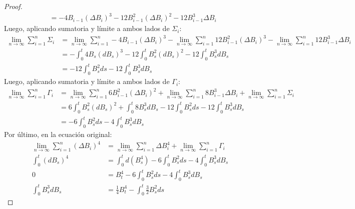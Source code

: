 \documentclass[11pt]{article}
\theoremstyle{definition}
\theoremstyle{remark}
\theoremstyle{remark}
\begin{document}
\begin{proof}
\begin{align*}
    &= -4B_{i-1}(\Delta B_i)^3 - 12B_{i-1}^2(\Delta B_i)^2 - 12B_{i-1}^3\Delta B_i
  \end{align*}
  Luego, aplicando sumatoria y límite a ambos lados de $\Sigma_i$:
  \begin{align*}
    \lim_{n \rightarrow \infty}\sum_{i =1}^{n}\Sigma_i
    &= \lim_{n \rightarrow \infty}\sum_{i =1}^{n} -4B_{i-1}(\Delta B_i)^3 -
      \lim_{n \rightarrow \infty}\sum_{i =1}^{n} 12B_{i-1}^2(\Delta B_i)^3 -
      \lim_{n \rightarrow \infty}\sum_{i =1}^{n} 12B_{i-1}^3\Delta B_i \\
    &= -\int_0^t 4B_s (dB_s)^3 - 12 \int_0^t B_s^2 (dB_s)^2 - 12 \int_0^t B_s^3 dB_s \\
    &= -12\int_0^t B_s^2 ds -12 \int_0^t B_s^3 dB_s
  \end{align*}
    Luego, aplicando sumatoria y límite a ambos lados de $\Gamma_i$:
  \begin{align*}
    \lim_{n \rightarrow \infty}\sum_{i =1}^{n} \Gamma_i
    &= \lim_{n \rightarrow \infty}\sum_{i =1}^{n} 6B_{i-1}^2(\Delta B_i)^2 +
      \lim_{n \rightarrow \infty}\sum_{i =1}^{n} 8B_{i-1}^3\Delta B_i +
      \lim_{n \rightarrow \infty}\sum_{i =1}^{n} \Sigma_i \\
    &= 6\int_0^t B_s^2 (dB_s)^2 + \int_0^t 8B_s^3 dB_s - 12\int_0^t B_s^2 ds
      - 12\int_0^t B_s^3 dB_s \\
    &= -6\int_0^t B_s^2 ds - 4 \int_0^t B_s^3 dB_s
  \end{align*}
  Por último, en la ecuación original:
  \begin{align*}
    \lim_{n \rightarrow \infty}\sum_{i =1}^{n} (\Delta B_i)^4
    &= \lim_{n \rightarrow \infty}\sum_{i =1}^{n} \Delta B_i^4 +
      \lim_{n \rightarrow \infty}\sum_{i =1}^{n} \Gamma_i \\
    \int_0^t (dB_s)^4
    &= \int_0^td(B_s^4) - 6\int_0^t B_s^2 ds - 4 \int_0^t B_s^3 dB_s \\
    0 &= B_t^4 - 6\int_0^t B_s^2 ds - 4\int_0^t B_s^3 dB_s \\
    \int_0^t B_s^3 dB_s &= \frac{1}{4} B_t^4 - \int_0^t \frac{3}{2}B_s^2 ds
  \end{align*}
\end{proof}
\end{document}
